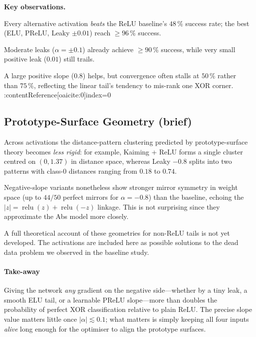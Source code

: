 \textbf{Key observations.}
\begin{enumerate*}[label=(\alph*)]
  \item Every alternative activation \emph{beats} the ReLU
        baseline's $48\,\%$ success rate;
        the best (ELU, PReLU, Leaky $\pm0.01$) reach $\ge96\,\%$
        success.%
        
  \item Moderate leaks ($\alpha=\pm0.1$) already achieve $\ge90\,\%$
        success, while very small positive leak ($0.01$) still trails.%
        
  \item A large positive slope ($0.8$) helps, but convergence often
        stalls at $50\,\%$ rather than $75\,\%$, reflecting the linear
        tail's tendency to mis-rank one XOR corner.%
        :contentReference[oaicite:0]{index=0}
\end{enumerate*}

\subsection*{Prototype-Surface Geometry (brief)}
Across activations the distance-pattern clustering predicted by
prototype-surface theory becomes \emph{less rigid}:  
for example, Kaiming + ReLU forms a single cluster centred on
$(0,1.37)$ in distance space, whereas Leaky $-0.8$ splits into two
patterns with class-$0$ distances ranging from $0.18$ to $0.74$.%

Negative-slope variants nonetheless show stronger mirror symmetry in
weight space (up to $44/50$ perfect mirrors for $\alpha=-0.8$) than the
baseline, echoing the
$|z|=\operatorname{relu}(z)+\operatorname{relu}(-z)$ linkage. 
This is not surprising since they approximate the Abs model more closely.

A full theoretical account of these geometries for non-ReLU tails is not
yet developed. The activations are included here as possible solutions to 
the dead data problem we observed in the baseline study.

\paragraph{Take-away}
Giving the network \emph{any} gradient on the negative side—whether by a
tiny leak, a smooth ELU tail, or a learnable PReLU slope—more than
doubles the probability of perfect XOR classification relative to plain
ReLU.  The precise slope value matters little once \(|\alpha|\lesssim0.1\);
what matters is simply keeping all four inputs \emph{alive} long enough
for the optimiser to align the prototype surfaces.

\hrulefill
